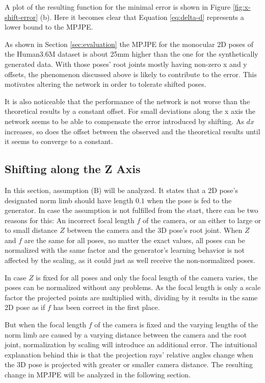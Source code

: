 
 
A plot of the resulting function for the minimal error is shown in Figure \ref{fig:x-shift-error} (b).
Here it becomes clear that Equation \eqref{eq:delta-d} represents a lower bound to the MPJPE.


As shown in Section \ref{sec:evaluation} the MPJPE for the monocular 2D poses of the Human3.6M dataset is about 25mm higher than the one for the synthetically generated data.
With those poses' root joints mostly having non-zero x and y offsets, the phenomenon discussed above is likely to contribute to the error.
This motivates altering the network in order to tolerate shifted poses.

It is also noticeable that the performance of the network is not worse than the theoretical results by a constant offset.
For small deviations along the x axis the network seems to be able to compensate the error introduced by shifting.
As $dx$ increases, so does the offset between the observed and the theoretical results until it seems to converge to a constant.

	
\subsection{Shifting along the Z Axis}
\label{sec:z-shift-error}

In this section, assumption (B) will be analyzed.
It states that a 2D pose's designated norm limb should have length $0.1$ when the pose is fed to the generator.
In case the assumption is not fulfilled from the start, there can be two reasons for this: 
An incorrect focal length $f$ of the camera, or an either to large or to small distance $Z$ between the camera and the 3D pose's root joint.
When $Z$ and $f$ are the same for all poses, no matter the exact values, all poses can be normalized with the same factor and the generator's learning behavior is not affected by the scaling, as it could just as well receive the non-normalized poses.

In case $Z$ is fixed for all poses and only the focal length of the camera varies, the poses can be normalized without any problems.
As the focal length is only a scale factor the projected points are multiplied with, dividing by it results in the same 2D pose as if $f$ has been correct in the first place.

But when the focal length $f$ of the camera is fixed and the varying lengths of the norm limb are caused by a varying distance between the camera and the root joint, normalization by scaling will introduce an additional error.
The intuitional explanation behind this is that the projection rays' relative angles change when the 3D pose is projected with greater or smaller camera distance.
The resulting change in MPJPE will be analyzed in the following section.

